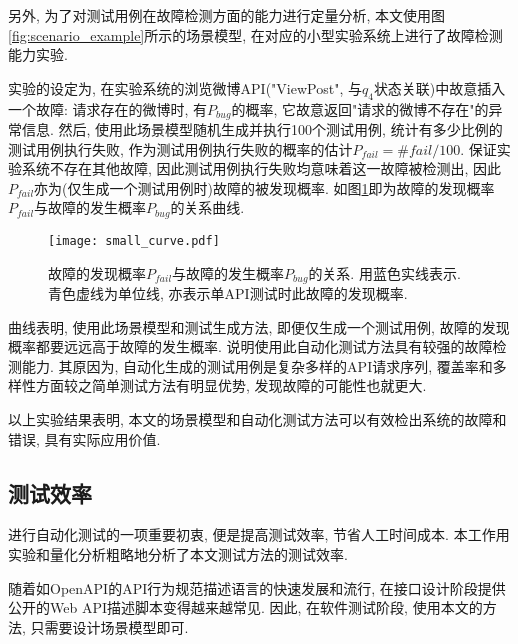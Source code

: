            另外, 为了对测试用例在故障检测方面的能力进行定量分析, 本文使用图\ref{fig:scenario_example}所示的场景模型, 在对应的小型实验系统上进行了故障检测能力实验.
            
            实验的设定为, 在实验系统的浏览微博API("ViewPost", 与$q_4$状态关联)中故意插入一个故障: 请求存在的微博时, 有$P_{bug}$的概率, 它故意返回"请求的微博不存在"的异常信息. 然后, 使用此场景模型随机生成并执行100个测试用例, 统计有多少比例的测试用例执行失败, 作为测试用例执行失败的概率的估计$P_{fail} = \# fail / 100$. 保证实验系统不存在其他故障, 因此测试用例执行失败均意味着这一故障被检测出, 因此$P_{fail}$亦为(仅生成一个测试用例时)故障的被发现概率. 如图\ref{fig:pbug_pfail_graph}即为故障的发现概率$P_{fail}$与故障的发生概率$P_{bug}$的关系曲线.
            \begin{figure}[!htb]
                \centering
                \texttt{[image: small\_curve.pdf]}
                \caption{故障的发现概率$P_{fail}$与故障的发生概率$P_{bug}$的关系. 用蓝色实线表示. 青色虚线为单位线, 亦表示单API测试时此故障的发现概率.}
                \label{fig:pbug_pfail_graph}
            \end{figure}
            曲线表明, 使用此场景模型和测试生成方法, 即便仅生成一个测试用例, 故障的发现概率都要远远高于故障的发生概率. 说明使用此自动化测试方法具有较强的故障检测能力. 其原因为, 自动化生成的测试用例是复杂多样的API请求序列, 覆盖率和多样性方面较之简单测试方法有明显优势, 发现故障的可能性也就更大.
            
            以上实验结果表明, 本文的场景模型和自动化测试方法可以有效检出系统的故障和错误, 具有实际应用价值.
    
        \subsection{测试效率}
    
            进行自动化测试的一项重要初衷, 便是提高测试效率, 节省人工时间成本. 本工作用实验和量化分析粗略地分析了本文测试方法的测试效率.
            
            随着如OpenAPI的API行为规范描述语言的快速发展和流行, 在接口设计阶段提供公开的Web API描述脚本变得越来越常见. 因此, 在软件测试阶段, 使用本文的方法, 只需要设计场景模型即可.
            
